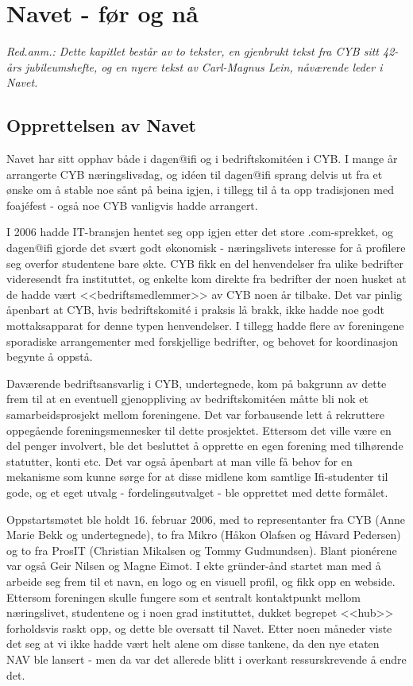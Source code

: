 \chapter[Navet]{Navet - før og nå}

\textit{Red.anm.: Dette kapitlet består av to tekster, en gjenbrukt tekst fra CYB sitt 42-års jubileumshefte, og en nyere tekst av Carl-Magnus Lein, nåværende leder i Navet.}

\section{Opprettelsen av Navet}

\author{Skrevet av Anna Dahl}

Navet har sitt opphav både i dagen@ifi og i bedriftskomitéen i CYB. I mange år arrangerte CYB næringslivsdag, og idéen til dagen@ifi sprang delvis ut fra et ønske om å stable noe sånt på beina igjen, i tillegg til å ta opp tradisjonen med foajéfest - også noe CYB vanligvis hadde arrangert.

I 2006 hadde IT-bransjen hentet seg opp igjen etter det store .com-sprekket, og dagen@ifi gjorde det svært godt økonomisk - næringslivets interesse for å profilere seg overfor studentene bare økte. CYB fikk en del henvendelser fra ulike bedrifter videresendt fra instituttet, og enkelte kom direkte fra bedrifter der noen husket at de hadde vært <<bedriftsmedlemmer>> av CYB noen år tilbake. Det var pinlig åpenbart at CYB, hvis bedriftskomité i praksis lå brakk, ikke hadde noe godt mottaksapparat for denne typen henvendelser. I tillegg hadde flere av foreningene sporadiske arrangementer med forskjellige bedrifter, og behovet for koordinasjon begynte å oppstå.

Daværende bedriftsansvarlig i CYB, undertegnede, kom på bakgrunn av dette frem til at en eventuell gjenoppliving av bedriftskomitéen måtte bli nok et samarbeidsprosjekt mellom foreningene. Det var forbausende lett å rekruttere oppegående foreningsmennesker til dette prosjektet. Ettersom det ville være en del penger involvert, ble det besluttet å opprette en egen forening med tilhørende statutter, konti etc. Det var også åpenbart at man ville få behov for en mekanisme som kunne sørge for at disse midlene kom samtlige Ifi-studenter til gode, og et eget utvalg - fordelingsutvalget - ble opprettet med dette formålet.

Oppstartsmøtet ble holdt 16. februar 2006, med to representanter fra CYB (Anne Marie Bekk og undertegnede), to fra Mikro (Håkon Olafsen og Håvard Pedersen) og to fra ProsIT (Christian Mikalsen og Tommy Gudmundsen). Blant pionérene var også Geir Nilsen og Magne Eimot. I ekte gründer-ånd startet man med å arbeide seg frem til et navn, en logo og en visuell profil, og fikk opp en webside. Ettersom foreningen skulle fungere som et sentralt kontaktpunkt mellom næringslivet, studentene og i noen grad instituttet, dukket begrepet <<hub>> forholdsvis raskt opp,
og dette ble oversatt til Navet. Etter noen måneder viste det seg at vi ikke hadde vært helt alene om disse tankene, da den nye etaten NAV ble lansert - men da var det allerede blitt i overkant ressurskrevende å endre det.

